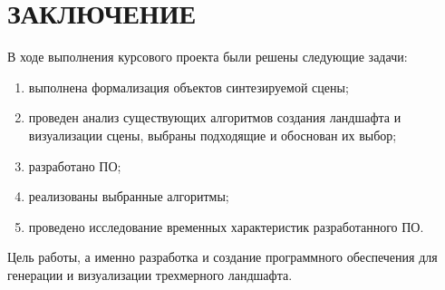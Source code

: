 \chapter*{ЗАКЛЮЧЕНИЕ}

В ходе выполнения курсового проекта были решены следующие задачи: 

\begin{enumerate}[label={\arabic*)}]
	\item выполнена формализация объектов синтезируемой сцены;
	\item проведен анализ существующих алгоритмов создания ландшафта и визуализации сцены, выбраны подходящие и обоснован их выбор;
	\item разработано ПО;
	\item реализованы выбранные алгоритмы;
	\item проведено исследование временных характеристик разработанного ПО.
\end{enumerate}

Цель работы, а именно разработка и создание программного обеспечения для генерации и визуализации трехмерного ландшафта.
